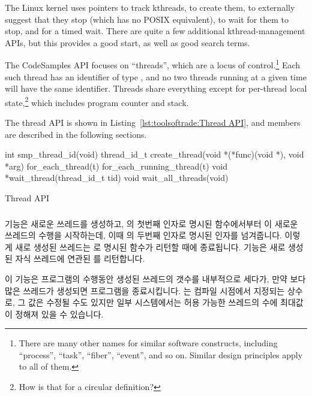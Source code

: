 The Linux kernel uses
 pointers to track kthreads,
 to create them,
 to externally suggest that they stop
(which has no POSIX equivalent),
 to wait for them to stop, and
 for a timed wait.
There are quite a few additional kthread-management APIs, but this
provides a good start, as well as good search terms.

The CodeSamples API focuses on ``threads'', which are a locus of
control.\footnote{
	There are many other names for similar software constructs, including
	``process'', ``task'', ``fiber'', ``event'', and so on.
	Similar design principles apply to all of them.}
Each such thread has an identifier of type ,
and no two threads running at a given time will have the same
identifier.
Threads share everything except for per-thread local state,\footnote{
	How is that for a circular definition?}
which includes program counter and stack.

The thread API is shown in
Listing~\ref{lst:toolsoftrade:Thread API}, and members are described in the
following sections.
\fi

\begin{listing}[tbp]
\begin{VerbatimL}[numbers=none,xleftmargin=2pt]
int smp_thread_id(void)
thread_id_t create_thread(void *(*func)(void *), void *arg)
for_each_thread(t)
for_each_running_thread(t)
void *wait_thread(thread_id_t tid)
void wait_all_threads(void)
\end{VerbatimL}
\caption{Thread API}
\label{lst:toolsoftrade:Thread API}
\end{listing}

\subsubsection{}

 기능은 새로운 쓰레드를 생성하고,  의
첫번째 인자로 명시된  함수에서부터 이 새로운 쓰레드의 수행을
시작하는데, 이때  의 두번째 인자로 명시된 인자를
넘겨줍니다.
이렇게 새로 생성된 쓰레드는  로 명시된 함수가 리턴할 때에 종료됩니다.
 기능은 새로 생성된 자식 쓰레드에 연관된 
를 리턴합니다.

이 기능은 프로그램의 수행동안 생성된 쓰레드의 갯수를 내부적으로 세다가, 만약
 보다 많은 쓰레드가 생성되면 프로그램을 종료시킵니다.
 는 컴파일 시점에서 지정되는 상수로, 그 값은 수정될 수도 있지만
일부 시스템에서는 허용 가능한 쓰레드의 수에 최대값이 정해져 있을 수 있습니다.
\iffalse

